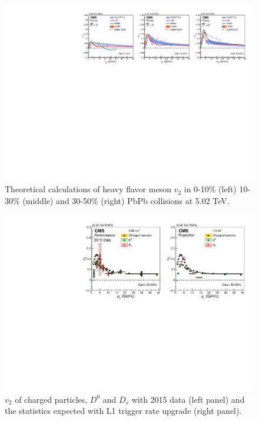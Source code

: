 \begin{figure}[!ht]
\begin{center}
\includegraphics[width=.98\textwidth]{figures/cTheoryV2_D_v1.pdf}
\caption{Theoretical calculations of heavy flavor meson $v_2$ in 0-10\% (left) 10-30\% (middle) and 30-50\% (right) PbPb collisions at 5.02 TeV.}
\label{fig:v2_theory}
\end{center}
\end{figure}

\begin{figure}[!ht]
\begin{center}
\includegraphics[width=.98\textwidth]{figures/cV2_lumiMB_1.pdf}
\caption{$v_2$ of charged particles, $D^0$ and $D_s$ with 2015 data (left panel) and the statistics expected with L1 trigger rate upgrade (right panel).}
\label{fig:v2_projection}
\end{center}
\end{figure}



